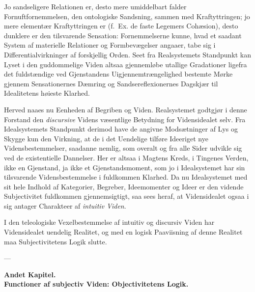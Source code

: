 \documentclass[12pt]{book}
\newcommand{\opage}[1]{\marginnote{\footnotesize\textit{[#1]}}}
\begin{document}
Jo sandseligere Relationen er, desto mere umiddelbart falder Fornuftfornemmelsen, den ontologiske
Sandsning, sammen med Kraftyttringen; jo mere elementær Kraftyttringen er (f.\ Ex. de faste Legemers
Cohæsion), desto dunklere er
\opage{263} den tilsvarende Sensation: Fornemmelserne kunne, hvad et saadant System af materielle Relationer og
Formbevægelser angaaer, tabe sig i Differentialvirkninger af forskjellig Orden. Seet fra Realsystemets
Standpunkt kan Lyset i den guddommelige Viden altsaa gjennemløbe utallige Gradationer ligefra det
fuldstændige ved Gjenstandens Uigjennemtrængelighed bestemte Mørke gjennem Sensationernes Dæmring og
Sandsereflexionernes Dagskjær til Idealitetens høieste Klarhed.

Herved naaes nu Eenheden af Begriben og Viden. Realsystemet godtgjør i denne Forstand den
\emph{discursive} Videns væsentlige Betydning for Vidensidealet selv. Fra Idealsystemets Standpunkt
derimod have de angivne Modsætninger af Lys og Skygge kun den Virkning, at de i det Uendelige tilføre
Ideeriget nye Vidensbestemmelser, saadanne nemlig, som overalt og fra alle Sider udvikle sig ved de
existentielle Dannelser. Her er altsaa i Magtens Kreds, i Tingenes Verden, ikke en Gjenstand, ja ikke
et Gjenstandsmoment, som jo i Idealsystemet har sin tilsvarende Vidensbestemmelse i fuldkommen Klarhed.
Da nu Idealsystemet med sit hele Indhold af Kategorier, Begreber, Ideemomenter og Ideer er den vidende
Subjectivitet fuldkommen gjennemsigtigt, saa sees heraf, at Vidensidealet ogsaa i sig antager
Charakteer af \emph{intuitiv Viden}.

I den teleologiske Vexelbestemmelse af intuitiv og discursiv Viden har Vidensidealet uendelig Realitet,
og med en logisk Paaviisning af denne Realitet maa Subjectivitetens Logik slutte.

\begin{center}---\end{center}

\opage{264} \begin{center}
{\large\bfseries Andet Kapitel.}\\[3pt]
{\Large\bfseries Functioner af subjectiv Viden: Objectivitetens Logik.}
\end{center}
\end{document}

